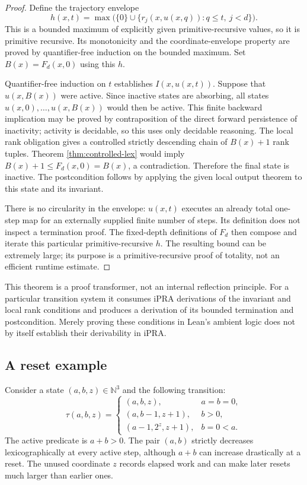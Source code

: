 \begin{proof}
Define the trajectory envelope
\[
 h(x,t)=\max\bigl(\{0\}\cup
 \{r_j(x,u(x,q)):q\le t,\ j<d\}\bigr).
\]
This is a bounded maximum of explicitly given primitive-recursive
values, so it is primitive recursive.  Its monotonicity and the
coordinate-envelope property are proved by quantifier-free induction on
the bounded maximum.  Set $B(x)=F_d(x,0)$ using this $h$.

Quantifier-free induction on $t$ establishes $I(x,u(x,t))$.  Suppose
that $u(x,B(x))$ were active.  Since inactive states are absorbing, all
states $u(x,0),\ldots,u(x,B(x))$ would then be active.  This finite
backward implication may be proved by contraposition of the direct
forward persistence of inactivity; activity is decidable, so this uses
only decidable reasoning.  The local rank obligation gives a controlled
strictly descending chain of $B(x)+1$ rank tuples.  Theorem
\ref{thm:controlled-lex} would imply
$B(x)+1\le F_d(x,0)=B(x)$, a contradiction.  Therefore the final state
is inactive.  The postcondition follows by applying the given local
output theorem to this state and its invariant.

There is no circularity in the envelope: $u(x,t)$ executes an already
total one-step map for an externally supplied finite number of steps.
Its definition does not inspect a termination proof.  The fixed-depth
definitions of $F_d$ then compose and iterate this particular
primitive-recursive $h$.  The resulting bound can be extremely large;
its purpose is a primitive-recursive proof of totality, not an efficient
runtime estimate.
\end{proof}

This theorem is a proof transformer, not an internal reflection principle.
For a particular transition system it consumes iPRA derivations of the
invariant and local rank conditions and produces a derivation of its
bounded termination and postcondition.  Merely proving these conditions
in Lean's ambient logic does not by itself establish their derivability
in iPRA.

\subsection{A reset example}

Consider a state $(a,b,z)\in\mathbb N^3$ and the following transition:
\[
 \tau(a,b,z)=
 \begin{cases}
 (a,b,z),&a=b=0,\\
 (a,b-1,z+1),&b>0,\\
 (a-1,2^z,z+1),&b=0<a.
 \end{cases}
\]
The active predicate is $a+b>0$.  The pair $(a,b)$ strictly decreases
lexicographically at every active step, although $a+b$ can increase
drastically at a reset.  The unused coordinate $z$ records elapsed work
and can make later resets much larger than earlier ones.

